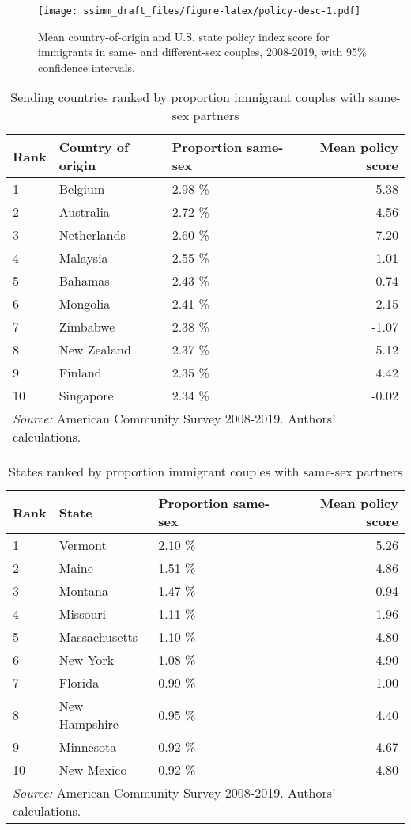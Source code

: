 \documentclass[
  11pt,
]{article}
\begin{document}
\begin{figure}
\centering
\texttt{[image: ssimm\_draft\_files/figure-latex/policy-desc-1.pdf]}
\caption{\label{fig:policy-desc}Mean country-of-origin and U.S. state policy index score for immigrants in same- and different-sex couples, 2008-2019, with 95\% confidence intervals.}
\end{figure}

\begin{table}

\caption{\label{tab:country-tab}Sending countries ranked by proportion immigrant couples with same-sex partners}
\centering
\begin{tabular}[t]{lllr}
\toprule
Rank & Country of origin & Proportion same-sex & Mean policy score\\
\midrule
1 & Belgium & 2.98 \% & 5.38\\
2 & Australia & 2.72 \% & 4.56\\
3 & Netherlands & 2.60 \% & 7.20\\
4 & Malaysia & 2.55 \% & -1.01\\
5 & Bahamas & 2.43 \% & 0.74\\
6 & Mongolia & 2.41 \% & 2.15\\
7 & Zimbabwe & 2.38 \% & -1.07\\
8 & New Zealand & 2.37 \% & 5.12\\
9 & Finland & 2.35 \% & 4.42\\
10 & Singapore & 2.34 \% & -0.02\\
\bottomrule
\multicolumn{4}{l}{\rule{0pt}{1em}\textit{Source:} American Community Survey 2008-2019. Authors' calculations.}\\
\end{tabular}
\end{table}

\begin{table}

\caption{\label{tab:state-tab}States ranked by proportion immigrant couples with same-sex partners}
\centering
\begin{tabular}[t]{lllr}
\toprule
Rank & State & Proportion same-sex & Mean policy score\\
\midrule
1 & Vermont & 2.10 \% & 5.26\\
2 & Maine & 1.51 \% & 4.86\\
3 & Montana & 1.47 \% & 0.94\\
4 & Missouri & 1.11 \% & 1.96\\
5 & Massachusetts & 1.10 \% & 4.80\\
6 & New York & 1.08 \% & 4.90\\
7 & Florida & 0.99 \% & 1.00\\
8 & New Hampshire & 0.95 \% & 4.40\\
9 & Minnesota & 0.92 \% & 4.67\\
10 & New Mexico & 0.92 \% & 4.80\\
\bottomrule
\multicolumn{4}{l}{\rule{0pt}{1em}\textit{Source:} American Community Survey 2008-2019. Authors' calculations.}\\
\end{tabular}
\end{table}
\end{document}
